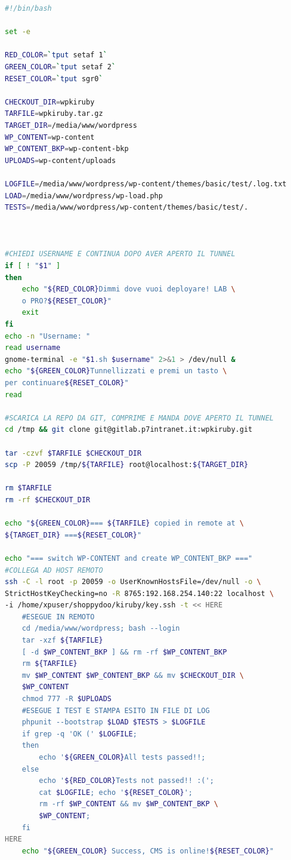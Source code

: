 \begin{lstlisting}[language=bash,caption={Script di deploy: kirCMS-autodeploy.sh}]
#!/bin/bash

set -e

RED_COLOR=`tput setaf 1`
GREEN_COLOR=`tput setaf 2`
RESET_COLOR=`tput sgr0`

CHECKOUT_DIR=wpkiruby
TARFILE=wpkiruby.tar.gz
TARGET_DIR=/media/www/wordpress
WP_CONTENT=wp-content
WP_CONTENT_BKP=wp-content-bkp
UPLOADS=wp-content/uploads

LOGFILE=/media/www/wordpress/wp-content/themes/basic/test/.log.txt
LOAD=/media/www/wordpress/wp-load.php
TESTS=/media/www/wordpress/wp-content/themes/basic/test/.



#CHIEDI USERNAME E CONTINUA DOPO AVER APERTO IL TUNNEL
if [ ! "$1" ]
then
    echo "${RED_COLOR}Dimmi dove vuoi deployare! LAB \
    o PRO?${RESET_COLOR}"
    exit
fi
echo -n "Username: "
read username
gnome-terminal -e "$1.sh $username" 2>&1 > /dev/null &
echo "${GREEN_COLOR}Tunnellizzati e premi un tasto \
per continuare${RESET_COLOR}"
read

#SCARICA LA REPO DA GIT, COMPRIME E MANDA DOVE APERTO IL TUNNEL
cd /tmp && git clone git@gitlab.p7intranet.it:wpkiruby.git

tar -czvf $TARFILE $CHECKOUT_DIR
scp -P 20059 /tmp/${TARFILE} root@localhost:${TARGET_DIR}

rm $TARFILE
rm -rf $CHECKOUT_DIR

echo "${GREEN_COLOR}=== ${TARFILE} copied in remote at \
${TARGET_DIR} ===${RESET_COLOR}"

echo "=== switch WP-CONTENT and create WP_CONTENT_BKP ==="
#COLLEGA AD HOST REMOTO
ssh -C -l root -p 20059 -o UserKnownHostsFile=/dev/null -o \
StrictHostKeyChecking=no -R 8765:192.168.254.140:22 localhost \ 
-i /home/xpuser/shoppydoo/kiruby/key.ssh -t << HERE
    #ESEGUE IN REMOTO
    cd /media/www/wordpress; bash --login
    tar -xzf ${TARFILE}
    [ -d $WP_CONTENT_BKP ] && rm -rf $WP_CONTENT_BKP
    rm ${TARFILE}
    mv $WP_CONTENT $WP_CONTENT_BKP && mv $CHECKOUT_DIR \
    $WP_CONTENT
    chmod 777 -R $UPLOADS
    #ESEGUE I TEST E STAMPA ESITO IN FILE DI LOG
    phpunit --bootstrap $LOAD $TESTS > $LOGFILE
    if grep -q 'OK (' $LOGFILE;
    then
        echo '${GREEN_COLOR}All tests passed!!;
    else
        echo '${RED_COLOR}Tests not passed!! :(';
        cat $LOGFILE; echo '${RESET_COLOR}';
        rm -rf $WP_CONTENT && mv $WP_CONTENT_BKP \
        $WP_CONTENT;    
    fi
HERE
    echo "${GREEN_COLOR} Success, CMS is online!${RESET_COLOR}"
\end{lstlisting}